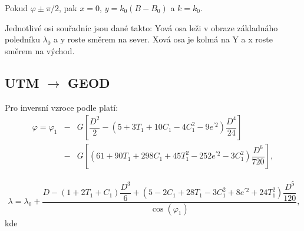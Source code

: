 Pokud $\varphi \pm \pi/2$, pak $x=0$, $y = k_{0}\left(B-B_{0}\right)$ a $k=k_{0}$.

Jednotlivé osi souřadníc jsou dané takto: Yová osa leži v obraze základnáho poledníku $\lambda_{0}$ a y roste směrem na sever. Xová osa je kolmá na Y a x roste směrem na východ. 

\subsection{UTM $\rightarrow$ GEOD}

Pro inversní vzroce podle \cite{Snyder1987}  platí:
\begin{eqnarray}
\varphi = \varphi_{1} &-& G\left[\dfrac{D^{2}}{2}-\left(5+3T_{1}+10C_{1}-4C_{1}^{2}-9e^{'2}\right)\dfrac{D^{4}}{24}\right] \\ \nonumber
                      &-& G\left[\left(61+90T_{1}+298C_{1}+45T_{1}^{2}-252e^{'2}-3C_{1}^{2}\right)\dfrac{D^{6}}{720}\right], 
                      \label{rov:invPhi}
\end{eqnarray}

\begin{eqnarray}
\lambda = \lambda_{0} + \dfrac{D-\left(1+2T_{1}+C_{1}\right)\dfrac{D^{3}}{6} + \left(5-2C_{1}+28T_{1}-3C_{1}^{2}+8e^{'2} + 24T_{1}^{2}\right)\dfrac{D^{5}}{120}}{\cos{\left(\varphi_{1}\right)}},
\label{rov:invLam}
\end{eqnarray}
kde


